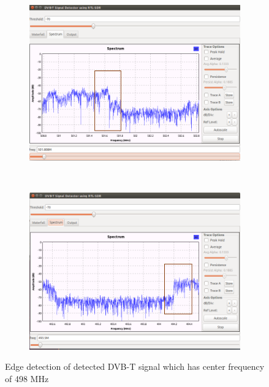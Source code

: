 \begin{figure}[H]
    \centering
    \begin{subfigure}[b]{0.4\textwidth}
        \includegraphics[width=\textwidth]{figures/signal-detect-1}
    \end{subfigure}
    ~ %
    \begin{subfigure}[b]{0.4\textwidth}
        \includegraphics[width=\textwidth]{figures/signal-detect-2}
    \end{subfigure}
    \caption{Edge detection of detected DVB-T signal which has center frequency of 498 MHz}\label{fig:edge-signal-detect}
\end{figure}

